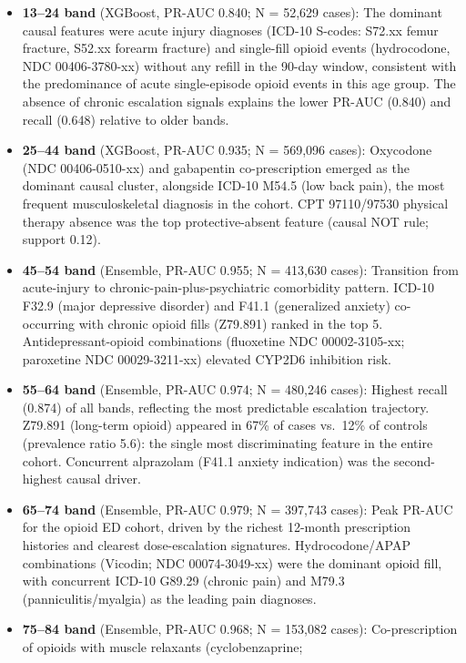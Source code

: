 \documentclass[
  12pt,
]{book}
\begin{document}
\begin{itemize}
\item
  \textbf{13--24 band} (XGBoost, PR-AUC 0.840; N = 52,629 cases): The
  dominant causal features were acute injury diagnoses (ICD-10 S-codes:
  S72.xx femur fracture, S52.xx forearm fracture) and single-fill opioid
  events (hydrocodone, NDC 00406-3780-xx) without any refill in the
  90-day window, consistent with the predominance of acute
  single-episode opioid events in this age group. The absence of chronic
  escalation signals explains the lower PR-AUC (0.840) and recall
  (0.648) relative to older bands.
\item
  \textbf{25--44 band} (XGBoost, PR-AUC 0.935; N = 569,096 cases):
  Oxycodone (NDC 00406-0510-xx) and gabapentin co-prescription emerged
  as the dominant causal cluster, alongside ICD-10 M54.5 (low back
  pain), the most frequent musculoskeletal diagnosis in the cohort. CPT
  97110/97530 physical therapy absence was the top protective-absent
  feature (causal NOT rule; support 0.12).
\item
  \textbf{45--54 band} (Ensemble, PR-AUC 0.955; N = 413,630 cases):
  Transition from acute-injury to chronic-pain-plus-psychiatric
  comorbidity pattern. ICD-10 F32.9 (major depressive disorder) and
  F41.1 (generalized anxiety) co-occurring with chronic opioid fills
  (Z79.891) ranked in the top 5. Antidepressant-opioid combinations
  (fluoxetine NDC 00002-3105-xx; paroxetine NDC 00029-3211-xx) elevated
  CYP2D6 inhibition risk.
\item
  \textbf{55--64 band} (Ensemble, PR-AUC 0.974; N = 480,246 cases):
  Highest recall (0.874) of all bands, reflecting the most predictable
  escalation trajectory. Z79.891 (long-term opioid) appeared in 67\% of
  cases vs.~12\% of controls (prevalence ratio 5.6): the single most
  discriminating feature in the entire cohort. Concurrent alprazolam
  (F41.1 anxiety indication) was the second-highest causal driver.
\item
  \textbf{65--74 band} (Ensemble, PR-AUC 0.979; N = 397,743 cases): Peak
  PR-AUC for the opioid ED cohort, driven by the richest 12-month
  prescription histories and clearest dose-escalation signatures.
  Hydrocodone/APAP combinations (Vicodin; NDC 00074-3049-xx) were the
  dominant opioid fill, with concurrent ICD-10 G89.29 (chronic pain) and
  M79.3 (panniculitis/myalgia) as the leading pain diagnoses.
\item
  \textbf{75--84 band} (Ensemble, PR-AUC 0.968; N = 153,082 cases):
  Co-prescription of opioids with muscle relaxants (cyclobenzaprine;

\end{itemize}
\end{document}
